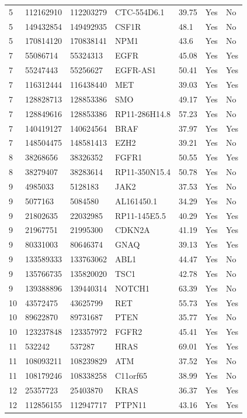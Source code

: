 \documentclass{article}
\begin{document}
\begin{center}
\begin{longtable}{ l l l l l l l}
5 & 112162910 & 112203279 & CTC-554D6.1 & 39.75 & Yes & No \\
5 & 149432854 & 149492935 & CSF1R & 48.1 & Yes & No \\
5 & 170814120 & 170838141 & NPM1 & 43.6 & Yes & No \\
7 & 55086714 & 55324313 & EGFR & 45.08 & Yes & Yes \\
7 & 55247443 & 55256627 & EGFR-AS1 & 50.41 & Yes & Yes \\
7 & 116312444 & 116438440 & MET & 39.03 & Yes & Yes \\
7 & 128828713 & 128853386 & SMO & 49.17 & Yes & No \\
7 & 128849616 & 128853386 & RP11-286H14.8 & 57.23 & Yes & No \\
7 & 140419127 & 140624564 & BRAF & 37.97 & Yes & Yes \\
7 & 148504475 & 148581413 & EZH2 & 39.21 & Yes & No \\
8 & 38268656 & 38326352 & FGFR1 & 50.55 & Yes & Yes \\
8 & 38279407 & 38283614 & RP11-350N15.4 & 50.78 & Yes & No \\
9 & 4985033 & 5128183 & JAK2 & 37.53 & Yes & No \\
9 & 5077163 & 5084580 & AL161450.1 & 34.29 & Yes & No \\
9 & 21802635 & 22032985 & RP11-145E5.5 & 40.29 & Yes & Yes \\
9 & 21967751 & 21995300 & CDKN2A & 41.19 & Yes & Yes \\
9 & 80331003 & 80646374 & GNAQ & 39.13 & Yes & Yes \\
9 & 133589333 & 133763062 & ABL1 & 44.47 & Yes & No \\
9 & 135766735 & 135820020 & TSC1 & 42.78 & Yes & No \\
9 & 139388896 & 139440314 & NOTCH1 & 63.39 & Yes & No \\
10 & 43572475 & 43625799 & RET & 55.73 & Yes & Yes \\
10 & 89622870 & 89731687 & PTEN & 35.77 & Yes & No \\
10 & 123237848 & 123357972 & FGFR2 & 45.41 & Yes & Yes \\
11 & 532242 & 537287 & HRAS & 69.01 & Yes & Yes \\
11 & 108093211 & 108239829 & ATM & 37.52 & Yes & No \\
11 & 108179246 & 108338258 & C11orf65 & 38.99 & Yes & No \\
12 & 25357723 & 25403870 & KRAS & 36.37 & Yes & Yes \\
12 & 112856155 & 112947717 & PTPN11 & 43.16 & Yes & Yes \\

\end{longtable}
\end{center}
\end{document}
